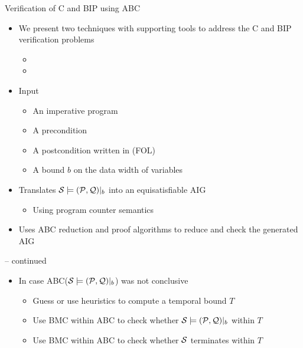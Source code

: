 \begin{frame}{Verification of C and BIP using ABC }
\begin{itemize}
 \item 
  We present two techniques with supporting tools to address the C and BIP verification problems
\begin{itemize} \item \mytool{} \item \biptool{}
 \end{itemize}
\end{itemize}
\end{frame}



\begin{frame}{\mytool }
\begin{itemize}
  \item Input
    \begin{itemize}
  \item An imperative program \Pm
  \item A precondition \Pre{} 
  \item A postcondition \Post{} written in (FOL)
  \item A bound $b$ on the data width of \Pm variables 
    \end{itemize}
  \item Translates $\mathcal{S} \models (\mathcal{P}, \mathcal{Q})|_b$ into an equisatisfiable AIG
    \begin{itemize}
      \item Using program counter semantics
    \end{itemize}
  \item Uses ABC reduction and proof algorithms to reduce and check the generated AIG
\end{itemize}
\end{frame}

\begin{frame}{\mytool -- continued  }
\begin{itemize}
  \item In case ABC($\mathcal{S} \models (\mathcal{P}, \mathcal{Q})|_b$) was not conclusive
    \begin{itemize}
  \item Guess or use heuristics to compute a temporal bound $T$
  \item Use BMC within ABC to check whether $\mathcal{S} \models (\mathcal{P}, \mathcal{Q})|_b$ within $T$
  \item Use BMC within ABC to check whether $\mathcal{S}$ terminates within $T$
    \end{itemize}
\end{itemize}
\end{frame}


